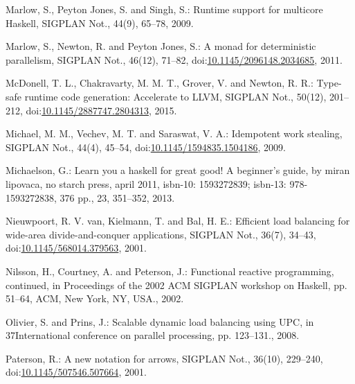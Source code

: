 \documentclass[paper=A4,twoside=true,openright,parskip=full,chapterprefix=true,headings=normal,bibliography=totoc,listof=totoc,titlepage=on,captions=tableabove,draft=false,british]{scrreprt}%
\begin{document}
\leavevmode\hypertarget{ref-Marlow2009}{}%
Marlow, S., Peyton Jones, S. and Singh, S.: Runtime support for
multicore Haskell, SIGPLAN Not., 44(9), 65--78, 2009.

\leavevmode\hypertarget{ref-par-monad}{}%
Marlow, S., Newton, R. and Peyton Jones, S.: A monad for deterministic
parallelism, SIGPLAN Not., 46(12), 71--82,
doi:\href{https://doi.org/10.1145/2096148.2034685}{10.1145/2096148.2034685},
2011.

\leavevmode\hypertarget{ref-McDonell:2015:TRC:2887747.2804313}{}%
McDonell, T. L., Chakravarty, M. M. T., Grover, V. and Newton, R. R.:
Type-safe runtime code generation: Accelerate to LLVM, SIGPLAN Not.,
50(12), 201--212,
doi:\href{https://doi.org/10.1145/2887747.2804313}{10.1145/2887747.2804313},
2015.

\leavevmode\hypertarget{ref-Michael:2009:IWS:1594835.1504186}{}%
Michael, M. M., Vechev, M. T. and Saraswat, V. A.: Idempotent work
stealing, SIGPLAN Not., 44(4), 45--54,
doi:\href{https://doi.org/10.1145/1594835.1504186}{10.1145/1594835.1504186},
2009.

\leavevmode\hypertarget{ref-learnyouahaskell}{}%
Michaelson, G.: Learn you a haskell for great good! A beginner's guide,
by miran lipovaca, no starch press, april 2011, isbn-10: 1593272839;
isbn-13: 978-1593272838, 376 pp., 23, 351--352, 2013.

\leavevmode\hypertarget{ref-vanNieuwpoort:2001:ELB:568014.379563}{}%
Nieuwpoort, R. V. van, Kielmann, T. and Bal, H. E.: Efficient load
balancing for wide-area divide-and-conquer applications, SIGPLAN Not.,
36(7), 34--43,\\
doi:\href{https://doi.org/10.1145/568014.379563}{10.1145/568014.379563},
2001.

\leavevmode\hypertarget{ref-Nilsson:2002:FRP:581690.581695}{}%
Nilsson, H., Courtney, A. and Peterson, J.: Functional reactive
programming, continued, in Proceedings of the 2002 ACM SIGPLAN workshop
on Haskell, pp. 51--64, ACM, New York, NY, USA., 2002.

\leavevmode\hypertarget{ref-4625841}{}%
Olivier, S. and Prins, J.: Scalable dynamic load balancing using UPC, in
37International conference on parallel processing, pp. 123--131., 2008.

\leavevmode\hypertarget{ref-Paterson:2001:NNA:507669.507664}{}%
Paterson, R.: A new notation for arrows, SIGPLAN Not., 36(10), 229--240,\\
doi:\href{https://doi.org/10.1145/507546.507664}{10.1145/507546.507664},
2001.
\end{document}
